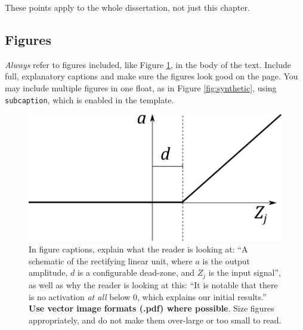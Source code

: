 \documentclass{l4proj}
\begin{document}
These points apply to the whole dissertation, not just this chapter.

\subsection{Figures}
\emph{Always} refer to figures included, like Figure \ref{fig:relu}, in the body of the text. Include full, explanatory captions and make sure the figures look good on the page.
You may include multiple figures in one float, as in Figure \ref{fig:synthetic}, using \texttt{subcaption}, which is enabled in the template.


\begin{figure}
    \centering
    \includegraphics[width=0.5\linewidth]{images/relu.pdf}    

    \caption{In figure captions, explain what the reader is looking at: ``A schematic of the rectifying linear unit, where $a$ is the output amplitude,
    $d$ is a configurable dead-zone, and $Z_j$ is the input signal'', as well as why the reader is looking at this: 
    ``It is notable that there is no activation \emph{at all} below 0, which explains our initial results.'' 
    \textbf{Use vector image formats (.pdf) where possible}. Size figures appropriately, and do not make them over-large or too small to read.
    }

    \label{fig:relu} 
\end{figure}
\end{document}
